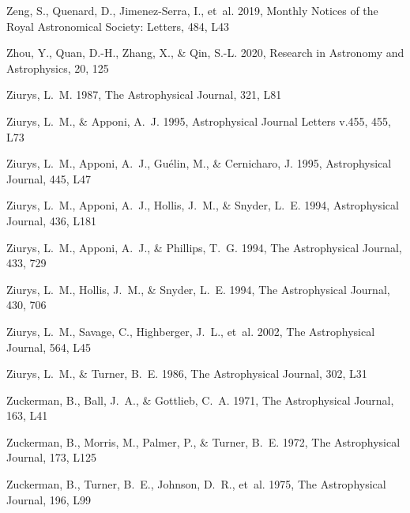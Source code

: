 \documentclass[twocolumn]{aastex631}
\begin{document}
\begin{thebibliography}{}
Zeng, S., Quenard, D., Jimenez-Serra, I., {et~al.} 2019, Monthly Notices of the
  Royal Astronomical Society: Letters, 484, L43

Zhou, Y., Quan, D.-H., Zhang, X., \& Qin, S.-L. 2020, Research in Astronomy and
  Astrophysics, 20, 125

Ziurys, L.~M. 1987, The Astrophysical Journal, 321, L81

Ziurys, L.~M., \& Apponi, A.~J. 1995, Astrophysical Journal Letters v.455, 455,
  L73

Ziurys, L.~M., Apponi, A.~J., Gu{\'e}lin, M., \& Cernicharo, J. 1995,
  Astrophysical Journal, 445, L47

Ziurys, L.~M., Apponi, A.~J., Hollis, J.~M., \& Snyder, L.~E.
  1994{}, Astrophysical Journal, 436, L181

Ziurys, L.~M., Apponi, A.~J., \& Phillips, T.~G. 1994{}, The
  Astrophysical Journal, 433, 729

Ziurys, L.~M., Hollis, J.~M., \& Snyder, L.~E. 1994{}, The
  Astrophysical Journal, 430, 706

Ziurys, L.~M., Savage, C., Highberger, J.~L., {et~al.} 2002, The Astrophysical
  Journal, 564, L45

Ziurys, L.~M., \& Turner, B.~E. 1986, The Astrophysical Journal, 302, L31

Zuckerman, B., Ball, J.~A., \& Gottlieb, C.~A. 1971, The Astrophysical Journal,
  163, L41

Zuckerman, B., Morris, M., Palmer, P., \& Turner, B.~E. 1972, The Astrophysical
  Journal, 173, L125

Zuckerman, B., Turner, B.~E., Johnson, D.~R., {et~al.} 1975, The Astrophysical
  Journal, 196, L99

\end{thebibliography}
\end{document}
